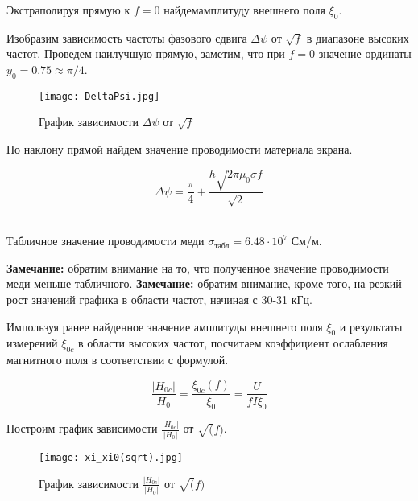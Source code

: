     Экстраполируя прямую к $f = 0$ найдемамплитуду внешнего поля $\xi_0$.

    \begin{center}
    \end{center}

    Изобразим зависимость частоты фазового сдвига $\Delta \psi$ от $\sqrt{f}$ в диапазоне высоких частот.
    Проведем наилучшую прямую, заметим, что при $f = 0$ значение ординаты $y_0 = 0.75 \approx \pi/4$.

    \begin{figure}
        \centering
        \texttt{[image: DeltaPsi.jpg]}
        \caption{График зависимости $\Delta \psi$ от $\sqrt{f}$}
        \label{DeltaPsi}
    \end{figure}

    По наклону прямой найдем значение проводимости материала экрана.

    \begin{equation}
        \Delta \psi = \frac{\pi}{4} + \frac{h \sqrt{2 \pi \mu_0 \sigma f}}{\sqrt{2}}
    \end{equation}

    \begin{center}
         \\
        Табличное значение проводимости меди $\sigma_{\text{табл}} = 6.48 \cdot 10^7$ См/м.
    \end{center}

    \textbf{Замечание:} обратим внимание на то, что полученное значение проводимости меди меньше табличного. %
    \textbf{Замечание:} обратим внимание, кроме того, на резкий рост значений графика в области частот, начиная с 30-31 кГц. %

    Импользуя ранее найденное значение амплитуды внешнего поля $\xi_0$ и результаты измерений $\xi_{0c}$
    в области высоких частот, посчитаем коэффициент ослабления магнитного поля в соответствии с формулой.

    \begin{equation}
        \frac{|H_{0c}|}{|H_{0}|} = \frac{\xi_{0c}(f)}{\xi_0} = \frac{U}{f I \xi_0}
    \end{equation}

    Построим график зависимости $\frac{|H_{0c}|}{|H_{0}|}$ от $\sqrt(f)$.

    \begin{figure}
        \centering
        \texttt{[image: xi\_xi0(sqrt).jpg]}
        \caption{График зависимости $\frac{|H_{0c}|}{|H_{0}|}$ от $\sqrt(f)$}
        \label{xi_xi0(sqrt)}
    \end{figure}

